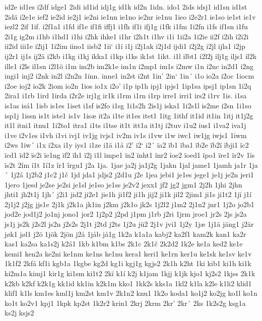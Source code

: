 id2e
id1es
i2df
idge1
2idi
id1id
idj1g
id1k
id2n
1idn.
ido1
2ids
idsj1
id1sn
id1st
2idä
i2e1e
ief2
ie2id
ie2j1
ie2ni
ie1nn
ie1no
ie2nr
ie1nu
1ieo
i2e2r1
ie1so
ie1st
ie1v
iezl2
2if
1if.
i2f1a1
i1fd
if1e
if1fi
iffj1
i1fh
if1i
ifj1g
i1fk
i1fm
1i2fn
i1fs
if1sn
i1fu
2i1g
ig2m
i1hb
i1hd1
i1hi
i2hk
ihke1
i1hr
i2h1t
i1hv
i1i
1ii2a
1i2ie
ii2f
i2ih
i2i2i
ii2id
iii1e
i2ij1
1i2im
iino1
iisb2
1ii`
i1í
i1j
i2j1ak
i2j1d
ijdi1
i2j2g
i2jl
ijla1
i2jp
ij2r1
ij1s
ij2ä
i2kb
i1kg
i1kj
ikka1
i1kp
i1ks
ik1st
1ikt.
i1l
ilbt1
i2l2j
ilj1g
iljs1
il2k
ille1
i2ls
il1sn
i2l1ö
i1m
im2b
im2k1e
im1n
i2mp1
im1s
i2mw
i1n
i2nc
in2d1
i2ng
ingi1
inj2
i2nk
in2l
i2n2n
1inn.
inne1
in2st
i2nt
1in'
2in`
1in´
i1o
io2a
i2oc
1iocm
i2oe
ioj2
io2k
2iom
io2n
1ios
io1x
i2o'
i1p
ip1h
ipj1
ipjs1
1ip1sa
ipsj1
ip1sn
1i2q
2ira1
i1rb
1ird
1irda
i2r2e
irj1g
ir1k
i1rm
i1rn
i1rp
irre1
irri1
irs2
i1rv
1is.
i1sa
is1as
isá1
1isb
is1es
1iset
i1sf
is2fo
i1sg
1i1s2h
2is1j
iska1
1i2s1l
is2me
i2sn
1i1so
isp1j
1issn
is1t
iste1
is1v
1isæ
it2a
i1te
it1es
itet1
1itg
1ithf
it1id
it1in
1itj
it1j2g
it1l
itni1
itnu1
1i2to1
itra1
i1ts
i1tse
it1t
itt1a
it1tj
i2tuv
i1u2
ius1
i1va2
iva1j
i1ve
i2v1es
i1vh
i1vi
ivj1
iv1jg
ivjs1
iv2m
iv1s
i1vw
i1w
iwc1
iw1jg
iwjs1
1iwm
i2ws
1iw´
i1x
i2xa
i1y
iys1
i1ze
i1ä
i1å
i2'
i2`
i2´
ïa2
ïb1
ïba1
ïb2e
ïb2ï
ïbji1
ïc2
ïcd1
ïd2
ïe2i
ïe1ng
ïf2
ïh1
ï2j
ï1l
ïmpe1
ïn2
ïnht1
ïnr2
ïoe2
ïoed1
ïpo1
ïre1
ïr2v
1ïs
ïs2t
2ím
í1t
1í1z
îr1
îrgu1
j2a
1ja.
1jae
ja2j
ja1j2g
1jakn
1jal
jame1
1jamh
ja1r
1ja´
1j2á
1j2b2
j1c2
j1č
1jd
jda1
jdjs2
j2d1u
j2e
1jea
jebi1
je1es
jege1
je1j
je2n
jeri1
1jero
1jesd
je2se
je2si
je1sl
je1so
je1ss
je2v2
jexx1
jf2
jg2
jgm1
2j2h
1jhi
2jhn
jhti1
jh2t1j
1jh´
j2i1
jid2
ji2e1
jie1h
ji1f2
ji1h
jij2
ji1k
jil2
2jim1
ji1s
ji1t2
1jï
j1í
2j1j2
j2jg
jjs1e
2j1k
j2k1a
jk1in
j2km
j2k1o
jk2s
1j2l2
j1m2
2j1n2
jnr1
1j2o
jo2b1
jod2e
jod1j2
jo1nj
jono1
jor2
1j2p2
j2pd
j1pm
j1rb
j2ri
1jrm
jroe1
jr2s
2js
js2a
js1j
js2k
j2s2l
js2n
j2s2s
2j1t
j2td
j2ts
1j2u
jü2
2j1v
jvi1
1j2y
1jæ
1j1ä
jäng1
j2är
jøk1
jøl1
j2ö
1jök
2jön
j2å
1jåb
jå1g
1k2a
k1a1a
kabj2
ka2f1
kam2k
kan1
ka2r
kas1
ka2sa
ka1s2j
k2á1
1kb
k1bm
k1bs
2k1c
2k1č
2k2d2
1k2e
ke1a
ked2
ke1e
kemi1
ken2a
ke2ni
ke1nm
ke1ns
ke1nu
kera1
keri1
ke1rn
ker1u
ke1sk
ke1sv
ke1v
1k1f2
2kfá
kf1i
kgb1a
1kgbe
kg2d
kg1i
kgj1g
kgjs2
2k1h
k2ht
1ki
kib1
ki1h
ki1k
ki2m1a
kimj1
kir1g
ki1sm
ki1t2
2kï
k1í
k2j
k1jam
1kjj
k1jk
kjo1
kj2s2
1kjss
2k1k
k2kb
k2kf
k2k1g
kk1id
kk1in
k2k1m
kko1
1kk2s
kks1a
1kl2
k1la
k2le
k1li2
klid1
klif1
k1ls
km1es
kml1j
km2st
km1v
2k1n2
knu1
1k2o
koda1
ko1j2
ko2jg
ko1l
ko1n
ko1t
ko2v1
kpj1
1kpk
kp2st
1k2r2
krin1
2krj
2krm
2kr'
2kr´
2ks
1k2s2g
ksg1a
ks2j
ksjs2
